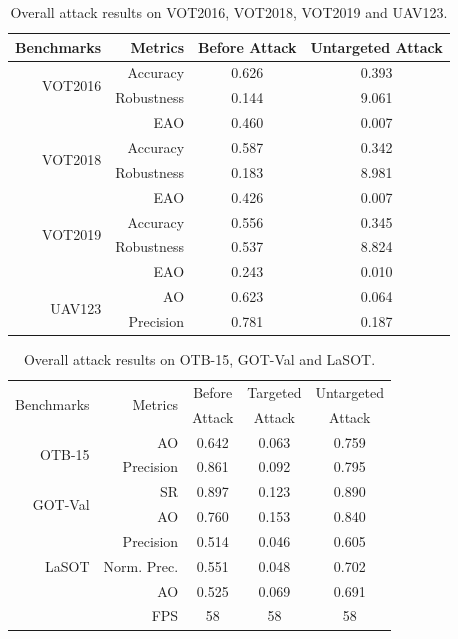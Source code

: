 \documentclass[journal]{IEEEtran}
\begin{document}
\begin{table}[t]
  \centering
  \caption{Overall attack results on VOT2016, VOT2018, VOT2019 and UAV123.}
  \begin{tabular}{rrcc}
  \toprule
  Benchmarks & Metrics & Before Attack    & Untargeted Attack  \\
  \midrule
  \multirow{2}{*}[-6pt]{VOT2016} 
  & Accuracy   & 0.626 & 0.393\\
  & Robustness & 0.144 & 9.061\\
  & EAO        & 0.460 & 0.007\\
  \midrule
  \multirow{2}{*}[-6pt]{VOT2018} 
  & Accuracy   & 0.587 & 0.342\\
  & Robustness & 0.183 & 8.981\\
  & EAO        & 0.426 & 0.007\\
  \midrule
  \multirow{2}{*}[-6pt]{VOT2019} 
  & Accuracy   & 0.556 & 0.345\\
  & Robustness & 0.537 & 8.824\\
  & EAO        & 0.243 & 0.010\\
  \midrule
  \multirow{3}{*}[+6pt]{UAV123} 
  & AO  & 0.623 & 0.064\\
  & Precision & 0.781 & 0.187\\
  \bottomrule
  \end{tabular}
  \label{tab:benchmark results1}
\end{table}

\begin{table}[t]
  \centering
  \caption{Overall attack results on OTB-15, GOT-Val and LaSOT.}
  \begin{tabular}{rrccc}
  \toprule
  \multirow{2}{*}{Benchmarks} & \multirow{2}{*}{Metrics} & Before    & Targeted & Untargeted  \\
                            &                         & Attack & Attack & Attack     \\ 
  \midrule
  \multirow{2}{*}{OTB-15} 
  & AO   & 0.642 & 0.063 & 0.759\\
  & Precision & 0.861 & 0.092 & 0.795\\
  \midrule
  \multirow{2}{*}{GOT-Val} 
  & SR & 0.897 & 0.123 & 0.890\\
  & AO & 0.760 & 0.153 & 0.840 \\
  \midrule
  \multirow{3}{*}{LaSOT} 
  & Precision  & 0.514 & 0.046 & 0.605\\
  & Norm. Prec.& 0.551 & 0.048 & 0.702\\
  & AO         & 0.525 & 0.069 & 0.691\\
  \midrule
  \multicolumn{2}{r}{FPS} & 58 & 58 & 58\\
  \bottomrule
  \end{tabular}
  \label{tab:benchmark results}
\end{table}
\end{document}
